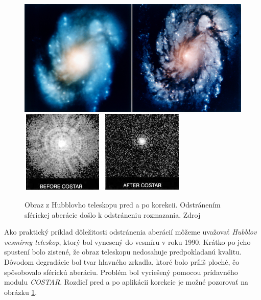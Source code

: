 \begin{figure}
    \centering
    \includegraphics[scale=0.3]{obrazky-figures/costarNASA.jpg}
    \includegraphics[scale=0.6]{obrazky-figures/cosar.jpg}
    \caption{Obraz z Hubblovho teleskopu pred a po korekcii. Odstránením sférickej aberácie došlo k
    odstráneniu rozmazania. Zdroj\cite{nasaHubble}}
    \label{hubbleImage}
\end{figure}


Ako praktický príklad dôležitosti odstránenia aberácií môžeme uvažovať \textit{Hubblov vesmírny
teleskop},
ktorý bol vynesený do vesmíru v roku 1990. Krátko po jeho spustení bolo zistené, že obraz
teleskopu nedosahuje predpokladanú kvalitu. Dôvodom degradácie bol tvar hlavného zrkadla, ktoré bolo
príliš ploché, čo spôsobovalo sférickú aberáciu. Problém bol vyriešený pomocou prídavného modulu
\textit{COSTAR}\cite{hechtoptics}. Rozdieľ pred a po aplikácii korekcie je možné pozorovať na obrázku
\ref{hubbleImage}. 

